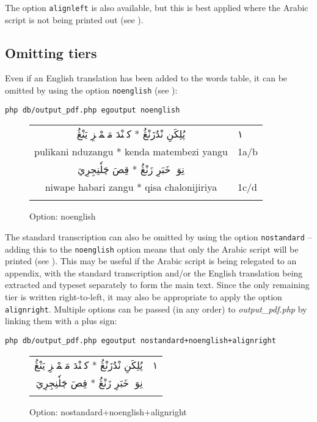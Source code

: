 The option \verb|alignleft| is also available, but this is best applied where the Arabic script is not being printed out (see ).

\subsection{Omitting tiers}
\label{ss:omittrans}

Even if an English translation has been added to the words table, it can be omitted by using the option \verb|noenglish| (see ):

\verb|php db/output_pdf.php egoutput noenglish|

\begin{figure}[H]
\begin{longtable}{cl}
\textcolor{mygreen}{\textarabic{پُلِكَنِ نْدُزَنْڠُ * كهٖنْدَ مَتٖمْبٖزِ يَنْڠُ}} & \textarabic{١} \\* 
pulikani nduzangu * kenda matembezi yangu & 1a/b \\* 
\textcolor{mygreen}{\textarabic{نِوَپٖ خَبَرِ زَنْڠُ * قِصَ چَلٗنِجِرِيَ}} &  \\* 
niwape habari zangu * qisa chalonijiriya & 1c/d \\*
\\[2mm] 
\end{longtable} 
\caption{Option: noenglish}
\label{fig:output:noenglish}
\end{figure}

The standard transcription can also be omitted by using the option \verb|nostandard|  -- adding this to the \verb|noenglish| option means that only the Arabic script will be printed (see ).  This may be useful if the Arabic script is being relegated to an appendix, with the standard transcription and/or the English translation being extracted and typeset separately to form the main text. Since the only remaining tier is written right-to-left, it may also be appropriate to apply the option \verb|alignright|.  Multiple options can be passed (in any order) to \textit{output_pdf.php} by linking them with a plus sign:

\verb|php db/output_pdf.php egoutput nostandard+noenglish+alignright|

\begin{figure}[H]
\begin{longtable}{rl}
\textcolor{mygreen}{\textarabic{پُلِكَنِ نْدُزَنْڠُ * كهٖنْدَ مَتٖمْبٖزِ يَنْڠُ}} & \textarabic{١} \\* 
\textcolor{mygreen}{\textarabic{نِوَپٖ خَبَرِ زَنْڠُ * قِصَ چَلٗنِجِرِيَ}} &  \\*
\\[2mm] 
\end{longtable} 
\caption{Option: nostandard+noenglish+alignright}
\label{fig:output:nostannoeng}
\end{figure}

